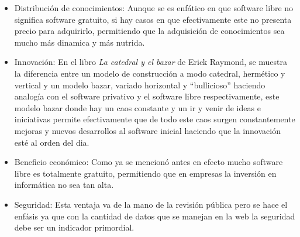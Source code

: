 \begin{multicols}{2}
\begin{itemize}
\item Distribución de conocimientos: Aunque se es enfático en que software libre no significa software gratuito, si hay casos en que efectivamente este no presenta precio para adquirirlo, permitiendo que la adquisición de conocimientos sea mucho más dinamica y más nutrida.
\item Innovación: En el libro \textit{La catedral y el bazar} de Erick Raymond, se muestra la diferencia entre un modelo de construcción a modo catedral, hermético y vertical y un modelo bazar, variado horizontal y “bullicioso” haciendo analogía con el software privativo y el software libre respectivamente, este modelo bazar donde hay un caos constante y un ir y venir de ideas e iniciativas permite efectivamente que de todo este caos surgen constantemente mejoras y nuevos desarrollos al software inicial haciendo que la innovación esté al orden del dia.
\item Beneficio económico: Como ya se mencionó antes en efecto mucho software libre es totalmente gratuito, permitiendo que en empresas la inversión en informática no sea tan alta.
\item Seguridad: Esta ventaja va de la mano de la revisión pública pero se hace el enfásis ya que con la cantidad de datos que se manejan en la web la seguridad debe ser un indicador primordial.
\end{itemize}


\end{multicols}
